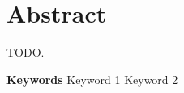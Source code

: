 \chapter{Abstract}

TODO.

{
    \vspace{1em}
    \setlength{\parindent}{0em}
    \textbf{Keywords} \; Keyword 1 \; Keyword 2 \par
}
